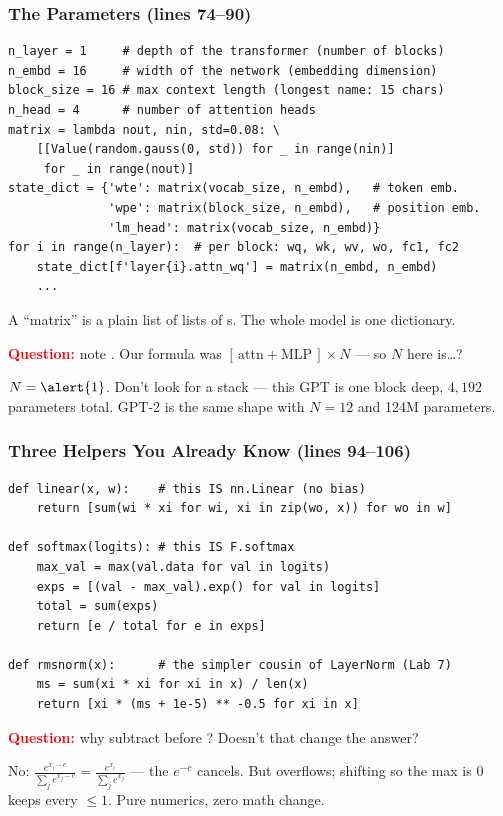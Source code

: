 \begin{frame}[fragile]
    \frametitle{The Parameters (lines 74--90)}

\begin{lstlisting}
n_layer = 1     # depth of the transformer (number of blocks)
n_embd = 16     # width of the network (embedding dimension)
block_size = 16 # max context length (longest name: 15 chars)
n_head = 4      # number of attention heads
matrix = lambda nout, nin, std=0.08: \
    [[Value(random.gauss(0, std)) for _ in range(nin)]
     for _ in range(nout)]
state_dict = {'wte': matrix(vocab_size, n_embd),   # token emb.
              'wpe': matrix(block_size, n_embd),   # position emb.
              'lm_head': matrix(vocab_size, n_embd)}
for i in range(n_layer):  # per block: wq, wk, wv, wo, fc1, fc2
    state_dict[f'layer{i}.attn_wq'] = matrix(n_embd, n_embd)
    ...
\end{lstlisting}

    A ``matrix'' is a plain \alert{list of lists of s}. The whole model is one dictionary.

    \pause

    \textcolor{red}{\textbf{Question:}} note . Our formula was $[\,\text{attn} + \text{MLP}\,]\times N$ --- so $N$ here is\dots?

    \pause

    $N = \alert{1}$. Don't look for a stack --- this GPT is one block deep, $4{,}192$ parameters total. GPT-2 is the same shape with $N=12$ and 124M parameters.
\end{frame}

\begin{frame}[fragile]
    \frametitle{Three Helpers You Already Know (lines 94--106)}

\begin{lstlisting}
def linear(x, w):    # this IS nn.Linear (no bias)
    return [sum(wi * xi for wi, xi in zip(wo, x)) for wo in w]

def softmax(logits): # this IS F.softmax
    max_val = max(val.data for val in logits)
    exps = [(val - max_val).exp() for val in logits]
    total = sum(exps)
    return [e / total for e in exps]

def rmsnorm(x):      # the simpler cousin of LayerNorm (Lab 7)
    ms = sum(xi * xi for xi in x) / len(x)
    return [xi * (ms + 1e-5) ** -0.5 for xi in x]
\end{lstlisting}

    \pause

    \textcolor{red}{\textbf{Question:}} why subtract  before ? Doesn't that change the answer?

    \pause

    No: $\frac{e^{x_i - c}}{\sum_j e^{x_j - c}} = \frac{e^{x_i}}{\sum_j e^{x_j}}$ --- the $e^{-c}$ cancels. But  \alert{overflows}; shifting so the max is $0$ keeps every  $\le 1$. Pure numerics, zero math change.
\end{frame}

